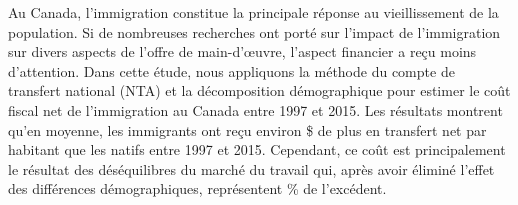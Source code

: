Au Canada, l'immigration constitue la principale réponse au vieillissement de la population. Si de nombreuses recherches ont porté sur l'impact de l'immigration sur divers aspects de l'offre de main-d'œuvre, l'aspect financier a reçu moins d'attention.
Dans cette étude, nous appliquons la méthode du compte de transfert national (NTA) et la décomposition démographique pour estimer le coût fiscal net de l'immigration au Canada entre 1997 et 2015.
Les résultats montrent qu'en moyenne, les immigrants ont reçu environ \$ de plus en transfert net par habitant que les natifs entre 1997 et 2015.
Cependant, ce coût est principalement le résultat des déséquilibres du marché du travail qui, après avoir éliminé l'effet des différences démographiques, représentent \% de l'excédent.